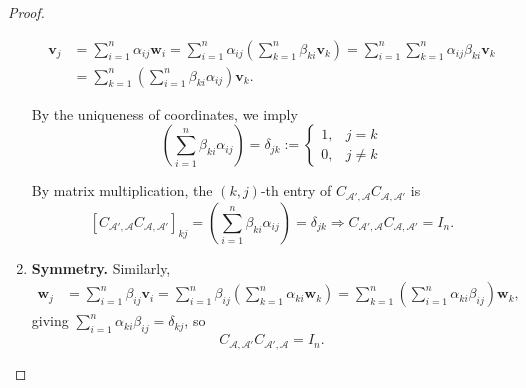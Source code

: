 \begin{proof}
\begin{enumerate}
    \begin{align*}
    \mathbf{v}_j 
    &= \sum_{i=1}^n \alpha_{ij} \mathbf{w}_i 
    = \sum_{i=1}^n \alpha_{ij} \left( \sum_{k=1}^n \beta_{ki} \mathbf{v}_k \right) 
    = \sum_{i=1}^n \sum_{k=1}^n \alpha_{ij} \beta_{ki} \mathbf{v}_k \\
    &= \sum_{k=1}^n \left( \sum_{i=1}^n \beta_{ki} \alpha_{ij} \right) \mathbf{v}_k.
    \end{align*}
    
    By the uniqueness of coordinates, we imply
    \[
    \left( \sum_{i=1}^n \beta_{ki} \alpha_{ij} \right) = \delta_{jk} := 
    \begin{cases}
    1, & j = k \\
    0, & j \ne k
    \end{cases}
    \]
    
    By matrix multiplication, the \( (k,j) \)-th entry of \( C_{\mathcal{A}',\mathcal{A}} C_{\mathcal{A},\mathcal{A}'} \) is
    \[
    [C_{\mathcal{A}',\mathcal{A}} C_{\mathcal{A},\mathcal{A}'}]_{kj} = \left( \sum_{i=1}^n \beta_{ki} \alpha_{ij} \right) = \delta_{jk}
    \Rightarrow C_{\mathcal{A}',\mathcal{A}} C_{\mathcal{A},\mathcal{A}'} = I_n.
    \]

  \item \textbf{Symmetry.} Similarly,
  \begin{align*}
    \mathbf{w}_j &= \sum_{i=1}^n \beta_{ij} \mathbf{v}_i 
    = \sum_{i=1}^n \beta_{ij} \left( \sum_{k=1}^n \alpha_{ki} \mathbf{w}_k \right) 
    = \sum_{k=1}^n \left( \sum_{i=1}^n \alpha_{ki} \beta_{ij} \right) \mathbf{w}_k,
  \end{align*}
  giving \( \sum_{i=1}^n \alpha_{ki} \beta_{ij} = \delta_{kj} \), so
  \[
  C_{\mathcal{A},\mathcal{A}'} C_{\mathcal{A}',\mathcal{A}} = I_n.
  \]
\end{enumerate}
\end{proof}


